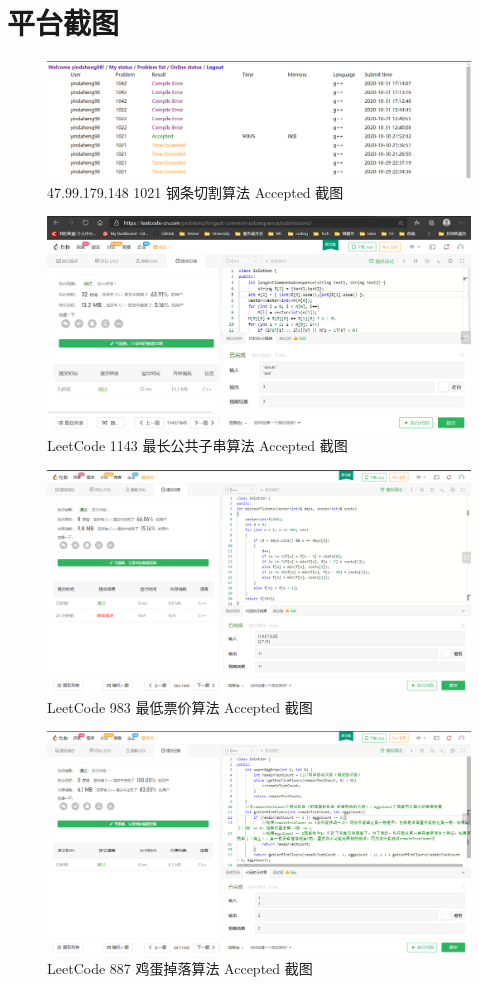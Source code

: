 \newpage
\section{平台截图}
\begin{figure}[htbp]
    \centering
    \includegraphics[width=1\textwidth]{OJ.png}
    \caption{47.99.179.148 1021 钢条切割算法 Accepted 截图}
\end{figure}
\begin{figure}[htbp]
    \centering
    \includegraphics[width=1\textwidth]{leetcode1143.png}
    \caption{LeetCode 1143 最长公共子串算法 Accepted 截图}
\end{figure}
\begin{figure}[htbp]
    \centering
    \includegraphics[width=1\textwidth]{leetcode983.png}
    \caption{LeetCode 983 最低票价算法 Accepted 截图}
\end{figure}
\begin{figure}[htbp]
    \centering
    \includegraphics[width=1\textwidth]{leetcode887.png}
    \caption{LeetCode 887 鸡蛋掉落算法 Accepted 截图}
\end{figure}